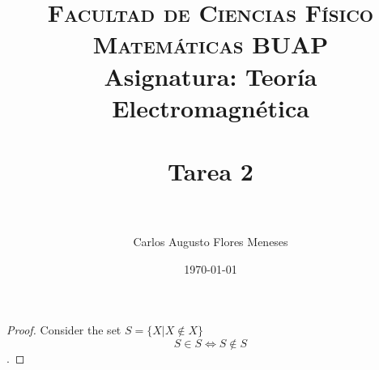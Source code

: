 \documentclass[answers]{exam}
\title{	
	\normalfont \normalsize 
	\textsc{Facultad de Ciencias Físico Matemáticas BUAP} \\
	Asignatura: Teoría Electromagnética\\[25pt] %
	\horrule{0.5pt} \\[0.4cm] %
	\huge Tarea 2 \\ %
	\horrule{2pt} \\[0.5cm] %
}
\author{Carlos Augusto Flores Meneses} %
\date{\normalsize\today} %
\begin{document}
	\maketitle %



\begin{questions}
	
	\begin{solution}\renewcommand{\qedsymbol}{}
		\begin{proof}
			Consider the set $S = \{ X | X \notin X \}$
			$$S \in S \iff S \notin S$$.
		\end{proof}
	\end{solution}
\end{questions}
\end{document}
